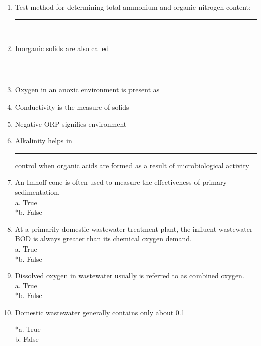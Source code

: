 \begin{enumerate}
\item Test method for determining total ammonium and organic nitrogen content: \rule{0.5cm}{0.3mm}\\

\item Inorganic solids are also called \rule{0.5cm}{0.3mm}\\

\item Oxygen in an anoxic environment is present as {\underline{\hspace{1cm}}} \\

\item Conductivity is the measure of {\underline{\hspace{1cm}}} solids \\

\item Negative ORP signifies {\underline{\hspace{1cm}}} environment \\

\item Alkalinity helps in \rule{0.5cm}{0.3mm} control when organic acids are formed as a result of microbiological activity \\

\item  An Imhoff cone is often used to measure the effectiveness of primary sedimentation. \\

a. True \\
*b. False 

\item  At a primarily domestic wastewater treatment plant, the influent wastewater BOD is always greater than its chemical oxygen demand. \\

a. True \\
*b. False 

\item  Dissolved oxygen in wastewater usually is referred to as combined oxygen. \\

a. True \\
*b. False 

\item  Domestic wastewater generally contains only about 0.1%

*a. True \\
b. False 


\end{enumerate}
